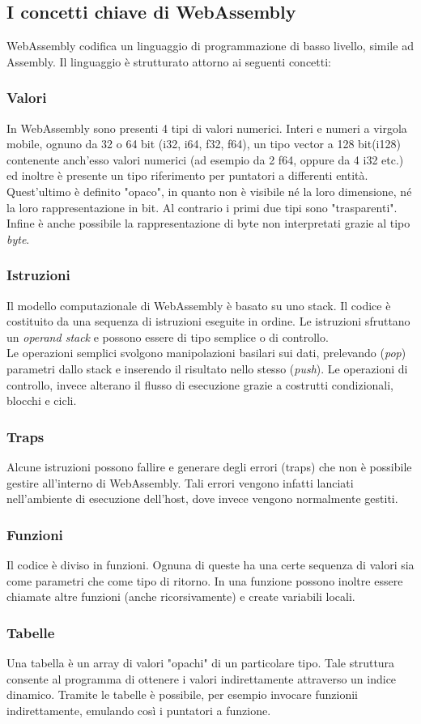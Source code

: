 \newpage
\subsection{I concetti chiave di WebAssembly}
WebAssembly codifica un linguaggio di programmazione di basso livello, simile ad Assembly. Il linguaggio è strutturato attorno ai seguenti concetti:\cite*{wasmSpec}

\subsubsection{Valori}
In WebAssembly sono presenti 4 tipi di valori numerici. Interi e numeri a virgola mobile, ognuno da 32 o 64 bit (i32, i64, f32, f64), un tipo vector a 128 bit(i128) contenente anch'esso valori numerici (ad esempio da 2 f64, oppure da 4 i32 etc.) ed inoltre è presente un tipo riferimento per puntatori a differenti entità. 
\\Quest'ultimo è definito "opaco", in quanto non è visibile né la loro dimensione, né la loro rappresentazione in bit. Al contrario i primi due tipi sono "trasparenti".
\\Infine è anche possibile la rappresentazione di byte non interpretati grazie al tipo \emph{byte}.
\subsubsection{Istruzioni}
Il modello computazionale di WebAssembly è basato su uno stack. Il codice è costituito da una sequenza di istruzioni eseguite in ordine. Le istruzioni sfruttano un \emph{operand stack} e possono essere di tipo semplice o di controllo.
\\Le operazioni semplici svolgono manipolazioni basilari sui dati, prelevando (\emph{pop}) parametri dallo stack e inserendo il risultato nello stesso (\emph{push}). Le operazioni di controllo, invece alterano il flusso di esecuzione grazie a costrutti condizionali, blocchi e cicli.
\subsubsection{Traps} 
Alcune istruzioni possono fallire e generare degli errori (traps) che non è possibile gestire all'interno di WebAssembly. Tali errori vengono infatti lanciati nell'ambiente di esecuzione dell'host, dove invece vengono normalmente gestiti.
\subsubsection{Funzioni}
Il codice è diviso in funzioni. Ognuna di queste ha una certe sequenza di valori sia come parametri che come tipo di ritorno. In una funzione possono inoltre essere chiamate altre funzioni (anche ricorsivamente) e create variabili locali.
\newpage\subsubsection{Tabelle}
Una tabella è un array di valori "opachi" di un particolare tipo. Tale struttura consente al programma di ottenere i valori indirettamente attraverso un indice dinamico. Tramite le tabelle è possibile, per esempio invocare funzionii indirettamente, emulando così i puntatori a funzione.
